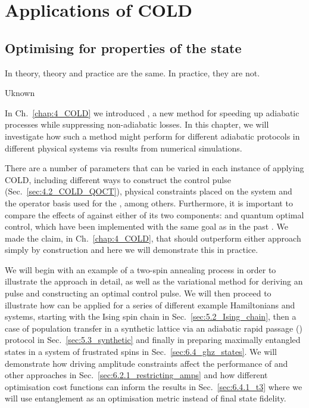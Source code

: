 \part{Applications of COLD}\label{part:applications}

\chapter{Optimising for properties of the state}\label{chap:6_Applications_fidelity}

\epigraph{In theory, theory and practice are the same. In practice, they are not.}{Uknown}

In Ch.~\ref{chap:4_COLD} we introduced , a new method for speeding up adiabatic processes while suppressing non-adiabatic losses. In this chapter, we will investigate how such a method might perform for different adiabatic protocols in different physical systems via results from numerical simulations. 

There are a number of parameters that can be varied in each instance of applying COLD, including different ways to construct the control pulse (Sec.~\ref{sec:4.2_COLD_QOCT}), physical constraints placed on the system and the operator basis used for the , among others. Furthermore, it is important to compare the effects of  against either of its two components:  and quantum optimal control, which have been implemented with the same goal as  in the past \cite{sels_minimizing_2017, glaser_training_2015, guery-odelin_shortcuts_2019}. We made the claim, in Ch.~\ref{chap:4_COLD}, that  should outperform either approach simply by construction and here we will demonstrate this in practice.

We will begin with an example of a two-spin annealing process in order to illustrate the  approach in detail, as well as the variational method for deriving an  pulse and constructing an optimal control pulse. We will then proceed to illustrate how  can be applied for a series of different example Hamiltonians and systems, starting with the Ising spin chain in Sec.~\ref{sec:5.2_Ising_chain}, then a case of population transfer in a synthetic lattice via an adiabatic rapid passage () protocol in Sec.~\ref{sec:5.3_synthetic} and finally in preparing maximally entangled states in a system of frustrated spins in Sec.~\ref{sec:6.4_ghz_states}. We will demonstrate how driving amplitude constraints affect the performance of  and other approaches in Sec.~\ref{sec:6.2.1_restricting_amps} and how different optimisation cost functions can inform the results in Sec.~\ref{sec:6.4.1_t3} where we will use entanglement as an optimisation metric instead of final state fidelity.

